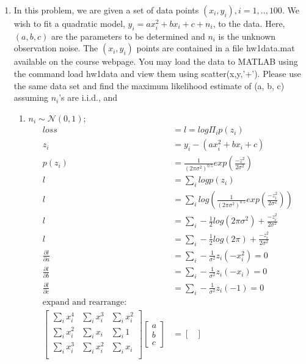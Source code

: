 \documentclass[12pt,letter]{article}
\begin{document}
\begin{enumerate}
\item In this problem, we are given a set of data points $(x_i, y_i ), i=1,..,100$. We wish to fit a quadratic model, $y_i = ax_i^2 + bx_i + c + n_i$, to the data. Here, $(a, b, c)$ are the parameters to be determined and $n_i$ is the unknown observation noise. The $(x_i, y_i)$ points are contained
in a file hw1data.mat available on the course webpage. You may load the data to MATLAB
using the command load hw1data and view them using scatter(x,y,'+'). Please use
the same data set and find the maximum likelihood estimate of (a, b, c) assuming $n_i$'s are
i.i.d., and
\begin{enumerate}
\item $n_i \sim \mathcal{N}(0, 1)$;
  \begin{align*}
    loss &= l = log \Pi_i p(z_i)\\
    z_i &= y_i - (ax_i^2+bx_i+c)\\
    p(z_i) &= \frac{1}{(2 \pi \sigma^2)^{0.5}} exp(\frac{-z^2}{2\sigma^2})\\
    l &= \sum_i log p(z_i)\\
    l &= \sum_i log (\frac{1}{(2 \pi \sigma^2)^{0.5}} exp(\frac{-z_i^2}{2\sigma^2}))\\
    l &= \sum_i -\frac{1}{2} log(2 \pi \sigma^2) + \frac{-z_i^2}{2\sigma^2}\\
    l &= \sum_i -\frac{1}{2} log(2 \pi) + \frac{-z_i^2}{2\sigma^2}\\
    \frac{\partial l}{\partial a} &= \sum_i -\frac{1}{\sigma^2}z_i(-x_i^2)=0\\
    \frac{\partial l}{\partial b} &= \sum_i -\frac{1}{\sigma^2}z_i(-x_i)=0\\
    \frac{\partial l}{\partial c} &= \sum_i -\frac{1}{\sigma^2}z_i(-1)=0\\
    \text{expand and rearrange: }\\
    \begin{bmatrix}
      \sum_i x_i^4 & \sum_i x_i^3 & \sum_ix_i^2\\
      \sum_i x_i^2 & \sum_i x_i & \sum_i1\\
      \sum_i x_i^3 & \sum_i x_i^2 & \sum_ix_i\\
    \end{bmatrix}
    \begin{bmatrix}
      a \\ b \\ c
    \end{bmatrix}
    &=
    \begin{bmatrix}

\end{bmatrix}
\end{align*}
\end{enumerate}
\end{enumerate}
\end{document}
